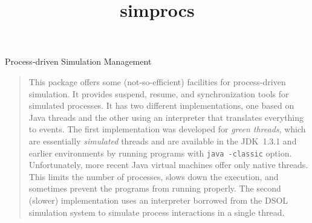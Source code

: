 \begin{titlepage}

\title{simprocs}{Process-driven Simulation Management}

\begin {quote}
This package offers some (not-so-efficient) facilities for process-driven 
simulation.  It provides suspend, resume,
and synchronization tools for simulated processes.
It has two different implementations, one based on Java threads
and the other using an interpreter that translates everything to events.
The first implementation was developed for \emph{green threads}, 
which are essentially \emph{simulated} threads and are available
in the JDK~1.3.1 and earlier environments by running programs with 
\texttt{java -classic} option.
Unfortunately, more recent Java virtual machines offer only native threads.
This limits the number of processes, slows down the execution,
and sometimes prevent the programs from running properly. 
The second (slower) implementation uses an interpreter borrowed from the DSOL
simulation system  to simulate process interactions in a single thread.
\end {quote}

\vfill\vfill

\end{titlepage}
